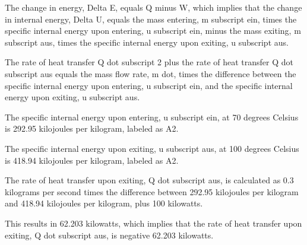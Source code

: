 The change in energy, Delta E, equals Q minus W, which implies that the change in internal energy, Delta U, equals the mass entering, m subscript ein, times the specific internal energy upon entering, u subscript ein, minus the mass exiting, m subscript aus, times the specific internal energy upon exiting, u subscript aus.

The rate of heat transfer Q dot subscript 2 plus the rate of heat transfer Q dot subscript aus equals the mass flow rate, m dot, times the difference between the specific internal energy upon entering, u subscript ein, and the specific internal energy upon exiting, u subscript aus.

The specific internal energy upon entering, u subscript ein, at 70 degrees Celsius is 292.95 kilojoules per kilogram, labeled as A2.

The specific internal energy upon exiting, u subscript aus, at 100 degrees Celsius is 418.94 kilojoules per kilogram, labeled as A2.

The rate of heat transfer upon exiting, Q dot subscript aus, is calculated as 0.3 kilograms per second times the difference between 292.95 kilojoules per kilogram and 418.94 kilojoules per kilogram, plus 100 kilowatts.

This results in 62.203 kilowatts, which implies that the rate of heat transfer upon exiting, Q dot subscript aus, is negative 62.203 kilowatts.